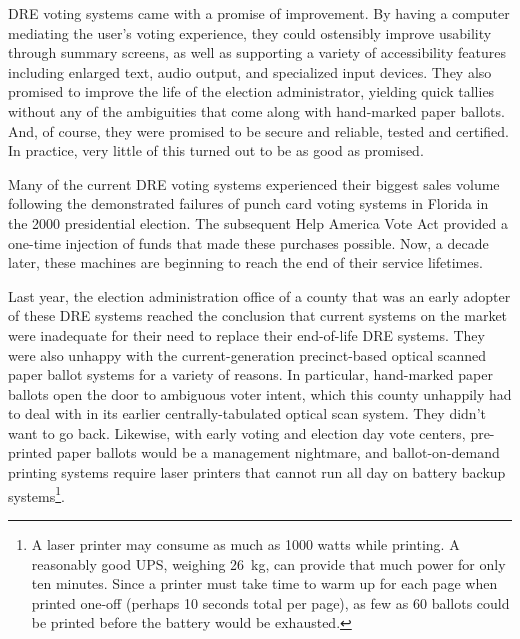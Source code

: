 \label{sec:intro}

DRE voting systems came with a promise of improvement. By having a
computer mediating the user's voting experience, they could ostensibly
improve usability through summary screens, as well as supporting a
variety of accessibility features including enlarged text, audio
output, and specialized input devices. They also promised to improve
the life of the election administrator, yielding quick tallies without
any of the ambiguities that come along with hand-marked paper ballots.
And, of course, they were promised to be secure and reliable, tested
and certified. In practice, very little of this turned out to be as
good as promised.

Many of the current DRE voting systems experienced their biggest sales
volume following the demonstrated failures of punch card voting
systems in Florida in the 2000 presidential election. The subsequent Help America Vote Act
provided a one-time injection of funds that made these purchases
possible. Now, a decade later, these machines are beginning to reach the end of
their service lifetimes. 

Last year, the election administration office of a county that was an
early adopter of these DRE systems reached the conclusion that current
systems on the market were inadequate for their need to replace their
end-of-life DRE systems. They were also unhappy with the
current-generation precinct-based optical scanned paper ballot systems
for a variety of reasons. In particular, hand-marked paper ballots
open the door to ambiguous voter intent, which this county unhappily
had to deal with in its earlier centrally-tabulated optical scan
system. They didn't want to go back. Likewise, with early
voting and election day vote centers, pre-printed paper ballots would
be a management nightmare, and ballot-on-demand printing systems
require laser printers that cannot run all day on battery backup
systems\footnote{A laser printer may consume as much as 1000 watts
  while printing. A reasonably good UPS, weighing 26~kg, can provide
  that much power for only ten minutes. Since a printer must take time
  to warm up for each page when printed one-off (perhaps 10
  seconds total per page), as few as 60 ballots could be printed before the
  battery would be exhausted.}.


